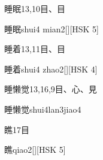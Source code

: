 \begin{entry}{睡眠}{13,10}{⽬、⽬}
  \begin{phonetics}{睡眠}{shui4 mian2}[][HSK 5]
  \end{phonetics}
\end{entry}

\begin{entry}{睡着}{13,11}{⽬、⽬}
  \begin{phonetics}{睡着}{shui4 zhao2}[][HSK 4]
  \end{phonetics}
\end{entry}

\begin{entry}{睡懒觉}{13,16,9}{⽬、⼼、⾒}
  \begin{phonetics}{睡懒觉}{shui4lan3jiao4}
  \end{phonetics}
\end{entry}

\begin{entry}{瞧}{17}{⽬}
  \begin{phonetics}{瞧}{qiao2}[][HSK 5]
  \end{phonetics}
\end{entry}


